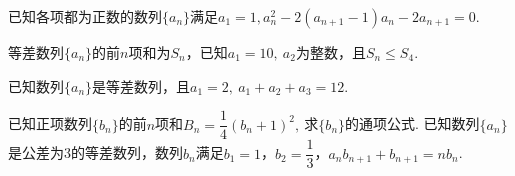 \documentclass[marginline,noindent,answers,adobefonts]{BHCexam}
\newcommand{\an}{\{a_n\}}
\begin{document}
\begin{questions}
\kongbai
\question
已知各项都为正数的数列$\an$满足$a_1=1,a_n^2-2(a_{n+1}-1)a_n-2a_{n+1}=0$.
\kongbai
\qs 等差数列$\{a_n\}$的前$n$项和为$S_n$，已知$a_1=10,~$$a_2$为整数，且$S_n\le S_4.$
\newpage
\qs 已知数列$\{a_n\}$是等差数列，且$a_1=2,~a_1+a_2+a_3=12.$
\kongbai
\qs 已知正项数列$ \{b_n\} $的前$n$项和$ B_n=\dfrac{1}{4}(b_n+1)^2,~$求$\{b_n\}$的通项公式.
\kongbai
\question
已知数列$\an$是公差为3的等差数列，数列${b_n}$满足$b_1=1$，$b_2=\dfrac{1}{3}$，$a_nb_{n+1}+b_{n+1}=nb_n$.
\begin{parts}

\end{parts}
\end{questions}
\end{document}
